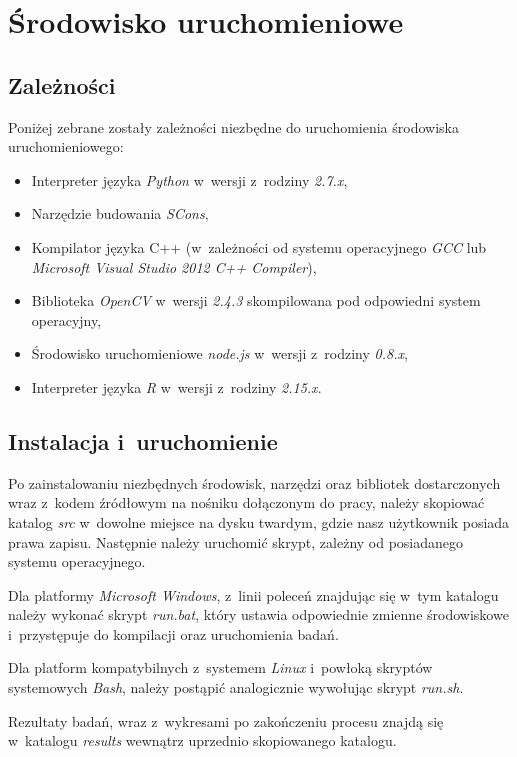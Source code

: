 \chapter{Środowisko uruchomieniowe}\label{Chapter_EnvironmentAppendix}
  \section{Zależności}\label{Section_Dependencies}

  Poniżej zebrane zostały zależności niezbędne do uruchomienia środowiska uruchomieniowego:
  \begin{itemize}
    \item Interpreter języka \textit{Python} w~wersji z~rodziny \textit{2.7.x},
    \item Narzędzie budowania \textit{SCons},
    \item Kompilator języka C++ (w~zależności od systemu operacyjnego \textit{GCC} lub \textit{Microsoft Visual Studio 2012 C++ Compiler}),
    \item Biblioteka \textit{OpenCV} w~wersji \textit{2.4.3} skompilowana pod odpowiedni system operacyjny,
    \item Środowisko uruchomieniowe \textit{node.js} w~wersji z~rodziny \textit{0.8.x},
    \item Interpreter języka \textit{R} w~wersji z~rodziny \textit{2.15.x}.
  \end{itemize}

  \section{Instalacja i~uruchomienie}\label{Section_Installation}

  Po zainstalowaniu niezbędnych środowisk, narzędzi oraz bibliotek dostarczonych wraz z~kodem źródłowym na nośniku dołączonym do pracy, należy skopiować katalog \textit{src} w~dowolne miejsce na dysku twardym, gdzie nasz użytkownik posiada prawa zapisu. Następnie należy uruchomić skrypt, zależny od posiadanego systemu operacyjnego.

  Dla platformy \textit{Microsoft Windows}, z~linii poleceń znajdując się w~tym katalogu należy wykonać skrypt \textit{run.bat}, który ustawia odpowiednie zmienne środowiskowe i~przystępuje do kompilacji oraz uruchomienia badań.

  Dla platform kompatybilnych z~systemem \textit{Linux} i~powłoką skryptów systemowych \textit{Bash}, należy postąpić analogicznie wywołując skrypt \textit{run.sh}.

  Rezultaty badań, wraz z~wykresami po zakończeniu procesu znajdą się w~katalogu \textit{results} wewnątrz uprzednio skopiowanego katalogu.